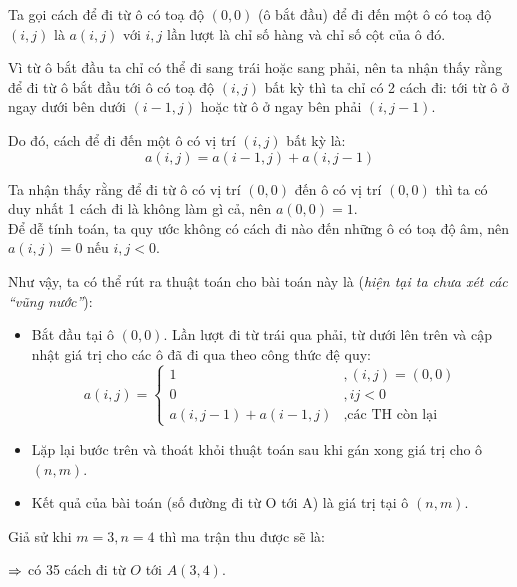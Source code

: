 \documentclass[main.tex]{subfiles}
\begin{document}
Ta gọi cách để đi từ ô có toạ độ $(0, 0)$ (ô bắt đầu) để đi đến một ô có toạ độ $(i,j)$ là $a(i, j)$ với $i, j$ lần lượt là chỉ số hàng và chỉ số cột của ô đó.

Vì từ ô bắt đầu ta chỉ có thể đi sang trái hoặc sang phải, nên ta nhận thấy rằng để đi từ ô bắt đầu tới ô có toạ độ $(i,j)$ bất kỳ thì ta chỉ có 2 cách đi: tới từ ô ở ngay dưới bên dưới $(i-1,j)$ hoặc từ ô ở ngay bên phải $(i,j-1)$. \par Do đó, cách để đi đến một ô có vị trí $(i, j)$ bất kỳ là:
$$
a(i, j) = a(i-1, j) + a(i, j-1)
$$

\par Ta nhận thấy rằng để đi từ ô có vị trí $(0, 0)$ đến ô có vị trí $(0, 0)$ thì ta có duy nhất 1 cách đi là không làm gì cả, nên $a(0,0) = 1$. \\ Để dễ tính toán, ta quy ước không có cách đi nào đến những ô có toạ độ âm, nên $a(i, j) = 0$ nếu $i, j < 0$. 

Như vậy, ta có thể rút ra thuật toán cho bài toán này là (\textit{hiện tại ta chưa xét các ``vũng nước''}):
\begin{itemize}
    \item Bắt đầu tại ô $(0, 0)$. Lần lượt đi từ trái qua phải, từ dưới lên trên và cập nhật giá trị cho các ô đã đi qua theo công thức đệ quy:
    $$
    a(i,j) = \begin{cases}
        1 &, (i, j) = (0, 0) \\
        0 &, ij < 0 \\
        a(i, j-1) + a(i-1,j) &, \text{các TH còn lại}    
    \end{cases}
    $$
    \item Lặp lại bước trên và thoát khỏi thuật toán sau khi gán xong giá trị cho ô $(n, m)$.
    \item Kết quả của bài toán (số đường đi từ O tới A) là giá trị tại ô $(n,m)$.
\end{itemize}
\pagebreak
Giả sử khi $m=3, n=4$ thì ma trận thu được sẽ là:
\begin{figure}[H]
    \centering
\end{figure}
$\Rightarrow$ có 35 cách đi từ $O$ tới $A(3,4)$.
\end{document}
